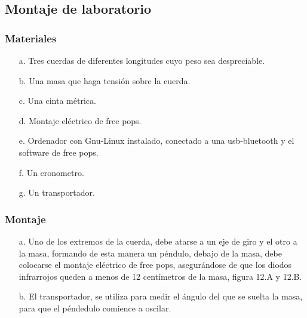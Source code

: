 \documentclass[12pt]{article}
\begin{document}
\begin{multicols}{2}
\subsection{Montaje de laboratorio}
\subsubsection{Materiales}
\begin{enumerate}
\item[a. ] Tres cuerdas de diferentes longitudes cuyo peso sea despreciable.
\item[b. ] Una masa que haga tensión sobre la cuerda.
\item[c. ] Una cinta métrica.
\item[d. ] Montaje eléctrico de free pops.
\item[e. ] Ordenador con Gnu-Linux instalado, conectado a una usb-bluetooth y el software de free pops.
\item[f. ] Un cronometro. 
\item[g. ] Un transportador. 
\end{enumerate}

\subsubsection{Montaje}

\begin{enumerate}
\item[a. ] Uno de los extremos de la cuerda, debe atarse a un eje de giro y el otro a la masa, formando de esta manera un péndulo,  debajo de la masa, debe colocarse el montaje eléctrico de free pops, asegurándose de que los diodos infrarrojos queden a menos de 12  centímetros  de la masa, figura 12.A y 12.B.
\item[b. ] El transportador, se  utiliza para medir el ángulo del que se suelta la masa, para que el péndedulo comience a oscilar.
\end{enumerate}


\end{multicols}
\end{document}
